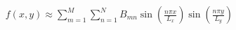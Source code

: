 \documentclass[preview]{standalone}
\begin{document}
\begin{align*}
f(x,y) \approx  \sum_{m=1}^M\sum_{n=1}^NB_{mn}\sin(\frac{n\pi x}{L_x})\sin(\frac{n\pi y}{L_y})
\end{align*}
\end{document}
